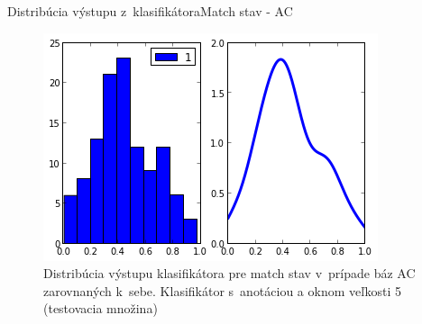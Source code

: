 \documentclass[xcolor=dvipsnames, compress, 12pt, t]{beamer}
\begin{document}
\begin{frame}{Distribúcia výstupu z~klasifikátora}{Match stav - AC}
\begin{figure}[hbtp]
    \centering
    \includegraphics[height=0.55\textheight]{images/distr_ac.png}
    \caption{Distribúcia výstupu klasifikátora pre match stav v~prípade báz AC zarovnaných k~sebe. Klasifikátor s~anotáciou a oknom veľkosti 5 (testovacia množina)}
\end{figure}
\end{frame}



\end{document}
